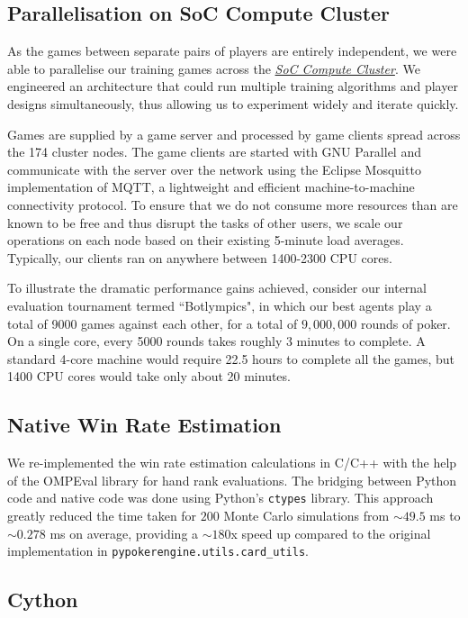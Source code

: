 \documentclass{article}
\begin{document}
\subsection{Parallelisation on SoC Compute Cluster}

As the games between separate pairs of players are entirely independent, we were able to parallelise our training games across the \hyperlink{computecluster}{\emph{SoC Compute Cluster}}. We engineered an architecture that could run multiple training algorithms and player designs simultaneously, thus allowing us to experiment widely and iterate quickly.

Games are supplied by a game server and processed by game clients spread across the 174 cluster nodes. The game clients are started with GNU Parallel \cite{Tange2011a} and communicate with the server over the network using the Eclipse Mosquitto \cite{ALight2017} implementation of MQTT, a lightweight and efficient machine-to-machine connectivity protocol. To ensure that we do not consume more resources than are known to be free and thus disrupt the tasks of other users, we scale our operations on each node based on their existing 5-minute load averages. Typically, our clients ran on anywhere between 1400-2300 CPU cores.

To illustrate the dramatic performance gains achieved, consider our internal evaluation tournament termed ``Botlympics", in which our best agents play a total of 9000 games against each other, for a total of \(9,000,000\) rounds of poker. On a single core, every 5000 rounds takes roughly 3 minutes to complete. A standard 4-core machine would require 22.5 hours to complete all the games, but 1400 CPU cores would take only about 20 minutes.

\subsection{Native Win Rate Estimation}

We re-implemented the win rate estimation calculations in C/C++ with the help of the OMPEval library \cite{timo:ompeval} for hand rank evaluations. The bridging between Python code and native code was done using Python's \texttt{ctypes} library. This approach greatly reduced the time taken for \(200\) Monte Carlo simulations from \({\sim}49.5\) ms to \({\sim}0.278\) ms on average, providing a \({\sim}180\)x speed up compared to the original implementation in \texttt{pypokerengine.utils.card\_utils}.

\subsection{Cython}
\end{document}
